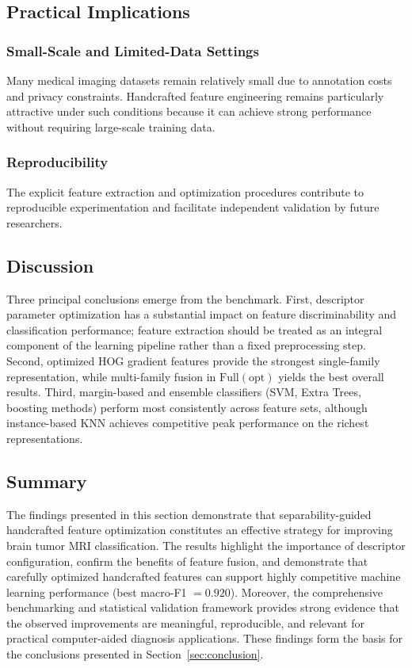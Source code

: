 \subsection{Practical Implications}
\label{sec:practical}

\subsubsection{Small-Scale and Limited-Data Settings}
Many medical imaging datasets remain relatively small due to annotation costs and
privacy constraints. Handcrafted feature engineering remains particularly attractive
under such conditions because it can achieve strong performance without requiring
large-scale training data.

\subsubsection{Reproducibility}
The explicit feature extraction and optimization procedures contribute to
reproducible experimentation and facilitate independent validation by future
researchers.

\subsection{Discussion}

Three principal conclusions emerge from the benchmark. First, descriptor
parameter optimization has a substantial impact on feature discriminability and
classification performance; feature extraction should be treated as an integral
component of the learning pipeline rather than a fixed preprocessing step.
Second, optimized HOG gradient features provide the strongest single-family
representation, while multi-family fusion in $\mathrm{Full(opt)}$ yields the
best overall results. Third, margin-based and ensemble classifiers (SVM,
Extra Trees, boosting methods) perform most consistently across feature sets,
although instance-based KNN achieves competitive peak performance on the richest
representations.

\subsection{Summary}
\label{sec:results_summary}

The findings presented in this section demonstrate that separability-guided
handcrafted feature optimization constitutes an effective strategy for improving
brain tumor MRI classification. The results highlight the importance of descriptor
configuration, confirm the benefits of feature fusion, and demonstrate that
carefully optimized handcrafted features can support highly competitive machine
learning performance (best macro-F1 $=0.920$). Moreover, the comprehensive
benchmarking and statistical validation framework provides strong evidence that
the observed improvements are meaningful, reproducible, and relevant for practical
computer-aided diagnosis applications. These findings form the basis for the
conclusions presented in Section~\ref{sec:conclusion}.
